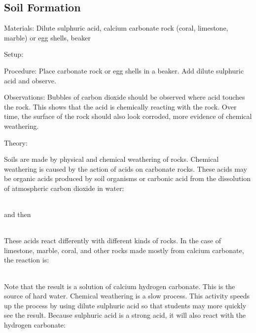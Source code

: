 \begin{multicols}{2}
\subsection{Soil Formation}


\begin{description*}
\item[Materials:]{Dilute sulphuric acid, calcium carbonate rock (coral, limestone, marble) or egg shells, beaker}
\item[Setup:]{}
\item[Procedure:]{Place carbonate rock or egg shells in a beaker. Add dilute sulphuric acid and observe.}
\item[Observations:]{Bubbles of carbon dioxide should be observed where acid touches the rock. This shows that the acid is chemically reacting with the rock. Over time, the surface of the rock should also look corroded, more evidence of chemical weathering.}
\item[Theory:]{
\raggedright Soils are made by physical and chemical weathering of rocks. Chemical weathering is caused by the action of acids on carbonate rocks. These acids may be organic acids produced by soil organisms or carbonic acid from the dissolution of atmospheric carbon dioxide in water:\\

\centering
{}\\
\raggedright

and then\\

\\
\raggedright

These acids react differently with different kinds of rocks. In the case of limestone, marble, coral, and other rocks made mostly from calcium carbonate, the reaction is:\\

\centering
{}\\	
\raggedright

Note that the result is a solution of calcium hydrogen carbonate. This is the source of hard water.
Chemical weathering is a slow process. This activity speeds up the process by using dilute sulphuric acid so that students may more quickly see the result. Because sulphuric acid is a strong acid, it will also react with the hydrogen carbonate:\\

}
\end{description*}
\end{multicols}
